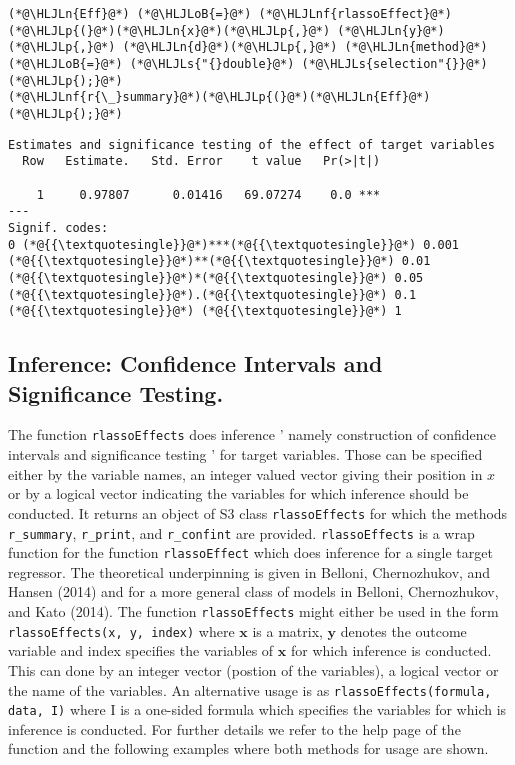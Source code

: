 \documentclass[12pt,a4paper]{article}
\newcommand{\HLJLn}[1]{#1}
\newcommand{\HLJLnf}[1]{\textcolor[RGB]{66,102,213}{#1}}
\newcommand{\HLJLs}[1]{\textcolor[RGB]{201,61,57}{#1}}
\newcommand{\HLJLoB}[1]{\textcolor[RGB]{102,102,102}{\textbf{#1}}}
\newcommand{\HLJLp}[1]{#1}
\begin{document}
\begin{lstlisting}
(*@\HLJLn{Eff}@*) (*@\HLJLoB{=}@*) (*@\HLJLnf{rlassoEffect}@*)(*@\HLJLp{(}@*)(*@\HLJLn{x}@*)(*@\HLJLp{,}@*) (*@\HLJLn{y}@*)(*@\HLJLp{,}@*) (*@\HLJLn{d}@*)(*@\HLJLp{,}@*) (*@\HLJLn{method}@*) (*@\HLJLoB{=}@*) (*@\HLJLs{"{}double}@*) (*@\HLJLs{selection"{}}@*)(*@\HLJLp{);}@*)
(*@\HLJLnf{r{\_}summary}@*)(*@\HLJLp{(}@*)(*@\HLJLn{Eff}@*)(*@\HLJLp{);}@*)
\end{lstlisting}

\begin{lstlisting}
Estimates and significance testing of the effect of target variables
  Row   Estimate.   Std. Error    t value   Pr(>|t|)

    1     0.97807      0.01416   69.07274    0.0 ***
---
Signif. codes:
0 (*@{{\textquotesingle}}@*)***(*@{{\textquotesingle}}@*) 0.001 (*@{{\textquotesingle}}@*)**(*@{{\textquotesingle}}@*) 0.01 (*@{{\textquotesingle}}@*)*(*@{{\textquotesingle}}@*) 0.05 (*@{{\textquotesingle}}@*).(*@{{\textquotesingle}}@*) 0.1 (*@{{\textquotesingle}}@*) (*@{{\textquotesingle}}@*) 1
\end{lstlisting}


\subsection{Inference: Confidence Intervals and Significance Testing.}
The function \texttt{rlassoEffects} does inference ' namely construction of confidence intervals and significance testing ' for target variables. Those can be specified either by the variable names, an integer valued vector giving their position in $x$ or by a logical vector indicating the variables for which inference should be conducted. It returns an object of S3 class \texttt{rlassoEffects} for which the methods \texttt{r\_summary}, \texttt{r\_print}, and \texttt{r\_confint} are provided. \texttt{rlassoEffects} is a wrap function for the function \texttt{rlassoEffect} which does inference for a single target regressor. The theoretical underpinning is given in Belloni, Chernozhukov, and Hansen (2014) and for a more general class of models in Belloni, Chernozhukov, and Kato (2014). The function \texttt{rlassoEffects} might either be used in the form \texttt{rlassoEffects(x, y, index)} where $\mathbf x$ is a matrix, $\mathbf y$ denotes the outcome variable and index specifies the variables of $\mathbf x$ for which inference is conducted. This can done by an integer vector (postion of the variables), a logical vector or the name of the variables. An alternative usage is as \texttt{rlassoEffects(formula, data, I)} where I is a one-sided formula which specifies the variables for which is inference is conducted. For further details we refer to the help page of the function and the following examples where both methods for usage are shown.
\end{document}
